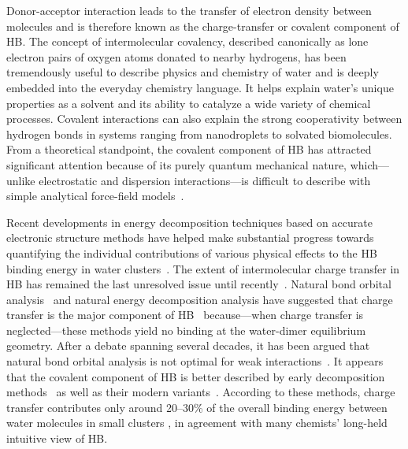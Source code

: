 \documentclass[journal=jacsat,manuscript=article]{achemso}
\begin{document}
Donor-acceptor interaction leads to the transfer of electron density between molecules and is therefore known as the charge-transfer or covalent component of HB. 
The concept of intermolecular covalency, described canonically as lone electron pairs of oxygen atoms donated to nearby hydrogens, has been tremendously useful to describe physics and chemistry of water and is deeply embedded into the everyday chemistry language. 
It helps explain water's unique properties as a solvent and its ability to catalyze a wide variety of chemical processes. Covalent interactions can also explain the strong cooperativity between hydrogen bonds in systems ranging from nanodroplets to solvated biomolecules. 
From a theoretical standpoint, the covalent component of HB has attracted significant attention because of its purely quantum mechanical nature, which---unlike electrostatic and dispersion interactions---is difficult to describe with simple analytical force-field models~\cite{lee2011effects, gordon2013accurate}.

Recent developments in energy decomposition techniques based on accurate electronic structure methods have helped make substantial progress towards quantifying the individual contributions of various physical effects to the HB binding energy in water clusters~\cite{stevens1987frozen, stone1993computation, chen1996energy, schenter1996natural, glendening2005natural, weinhold2005resonance, piquemal2005csov, khaliullin2009electron, cobar2012examination, guevara2016hydrogen}. 
The extent of intermolecular charge transfer in HB has remained the last unresolved issue until recently~\cite{isaacs1999covalency, ghanty2000hydrogen, stone2017natural}. 
Natural bond orbital analysis~\cite{weinhold1998natural} and natural energy decomposition analysis \cite{glendening1994natural} have suggested that charge transfer is the major component of HB~\cite{schenter1996natural,glendening2005natural,weinhold2005resonance} because---when charge transfer is neglected---these methods yield no binding at the water-dimer equilibrium geometry. 
After a debate spanning several decades, it has been argued that natural bond orbital analysis is not optimal for weak interactions~\cite{stone2017natural}. 
It appears that the covalent component of HB is better described by early decomposition methods~\cite{kitaura1976new, bagus1984new, bagus1992decomposition, stevens1987frozen, chen1996energy, stone1993computation} as well as their modern variants~\cite{mo2000energy, misquitta2013charge, khaliullin2007unravelling}. 
According to these methods, charge transfer contributes only around 20--30\% of the overall binding energy between water molecules in small clusters \cite{stevens1987frozen, stone1993computation, chen1996energy, piquemal2005csov, khaliullin2009electron, cobar2012examination}, in agreement with many chemists' long-held intuitive view of HB.
\end{document}
